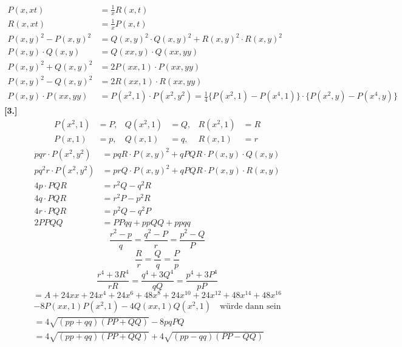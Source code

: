 \documentclass[10pt,a4paper]{article}
\begin{document}
\begin{align*}
P(x, xt) &= \tfrac{1}{x} R(x, t) \\
R(x, xt) &= \tfrac{1}{x} P(x, t) \\
P(x, y)^2 - P(x, y)^2 &= Q(x, y)^2 \cdot Q(x, y)^2 + R(x, y)^2 \cdot R(x, y)^2 \\
P(x, y) \cdot Q(x, y) &= Q(xx, y) \cdot Q(xx, yy) \\
P(x, y)^2 + Q(x, y)^2 &= 2P(xx, 1) \cdot P(xx, yy) \\
P(x, y)^2 - Q(x, y)^2 &= 2R(xx, 1) \cdot R(xx, yy) \\
P(x, y) \cdot P(xx, yy) &= P(x^2, 1) \cdot P(x^2, y^2) = \tfrac{1}{4}\{P(x^2, 1) - P(x^4, 1)\} \cdot \{P(x^2, y) - P(x^4, y)\}
\end{align*}
%
\textbf{[3.]}
%
\begin{align*}
P(x^2, 1) &= P, & Q(x^2, 1) &= Q, & R(x^2, 1) &= R \\
P(x, 1) &= p, & Q(x, 1) &= q, & R(x, 1) &= r
\end{align*}
%
\begin{align*}
pqr \cdot P(x^2, y^2) &= pqR \cdot P(x, y)^2 + qPQR \cdot P(x, y) \cdot Q(x, y) \\
pq^2r \cdot P(x^2, y^2) &= prQ \cdot P(x, y)^2 + qPQR \cdot P(x, y) \cdot R(x, y) \\
4p \cdot PQR &= r^2Q - q^2R \\
4q \cdot PQR &= r^2P - p^2R \\
4r \cdot PQR &= p^2Q - q^2P \\
2PPQQ &= PPqq + ppQQ + ppqq
\end{align*}
%
\begin{equation*}
\frac{r^2 - p}{q} = \frac{q^2 - P}{r} = \frac{p^2 - Q}{P}
\end{equation*}
%
\begin{equation*}
\frac{R}{r} = \frac{Q}{q} = \frac{P}{p}
\end{equation*}
%
\begin{equation*}
\frac{r^4 + 3R^4}{rR} = \frac{q^4 + 3Q^4}{qQ} = \frac{p^4 + 3P^4}{pP}
\end{equation*}
%
\begin{equation*}
= A + 24xx + 24x^4 + 24x^6 + 48x^8 + 24x^{10} + 24x^{12} + 48x^{14} + 48x^{16}
\end{equation*}
%
\begin{multline*}
- 8P(xx, 1)P(x^2, 1) - 4Q(xx, 1)Q(x^2, 1) \quad \text{w\"urde dann sein} \\
= 4\sqrt{(pp + qq)(PP + QQ)} - 8pqPQ \\
= 4\sqrt{(pp + qq)(PP + QQ)} + 4\sqrt{(pp - qq)(PP - QQ)}
\end{multline*}
\end{document}
